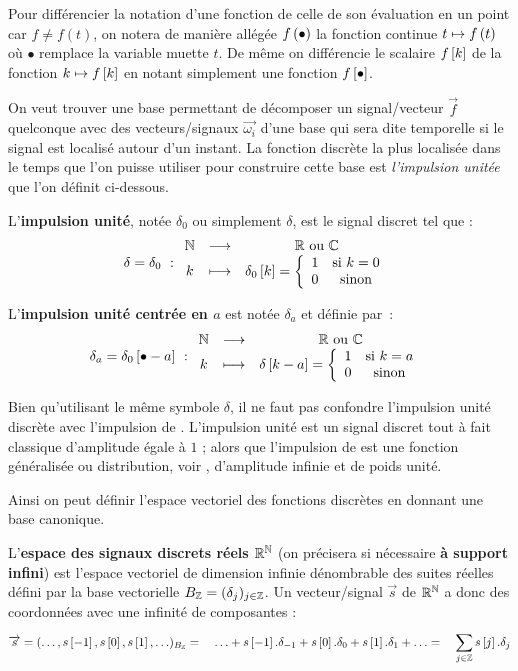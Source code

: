 Pour différencier la notation d'une fonction de celle de son
évaluation en un point car $f\neq f(t)$, on notera de manière allégée
$f\left(\bullet\right)$ la fonction continue $t\mapsto f\left(t\right)$ où $\bullet$
remplace la variable muette $t$. De même on différencie le scalaire
$f\left[k\right]$ de la fonction $k\mapsto f\left[k\right]$ en notant simplement une
fonction $f\left[\bullet\right]$.

On veut trouver une base permettant de décomposer un signal/vecteur
$\vec{f}$ quelconque avec des vecteurs/signaux $\vec{\omega_i}$ d'une
base qui sera dite temporelle si le signal est localisé autour d'un
instant. La fonction discrète la plus localisée dans le temps que l'on
puisse utiliser pour construire cette base est \emph{l'impulsion
  unitée} que l'on définit ci-dessous.
\begin{definition}
  \label{def:impulsion_unite}
  L'\textbf{impulsion unité}, notée $\delta_0$ ou simplement $\delta$,
  est le signal discret tel que :
  $$
  \delta=\delta_0~:\begin{array}{ccc} \mathbb{N} & \longrightarrow & \mathbb{R} \text{ ou } \mathbb{C} \\  k & \longmapsto & \delta_0\left[k\right]=\left\{\begin{array}{cc} {1} & {\text{si } k=0}\\ {0} & {\text{sinon}}\\ \end{array}\right. \\ \end{array} 
  $$

  L'\textbf{impulsion unité centrée en $a$} est notée $\delta_a$ et définie par~:
  $$
  \delta_a = \delta_0\left[\bullet-a\right]~: \begin{array}{ccc} \mathbb{N} & \longrightarrow & \mathbb{R} \text{ ou } \mathbb{C} \\ k & \longmapsto & \delta\left[k-a\right] =  \left\{\begin{array}{cc} {1} & {\text{si } k=a}\\ {0} & {\text{sinon}}\\ \end{array}\right. \\ \end{array}
  $$
\end{definition}

\begin{remarque}
  Bien qu'utilisant le même symbole $\delta$, il ne faut pas confondre
l'impulsion unité discrète avec l'impulsion de \Dirac. L'impulsion
unité est un signal discret tout à fait classique d'amplitude égale à
$1$ ; alors que l'impulsion de \Dirac{} est une fonction généralisée ou
distribution, voir , d'amplitude infinie et de
poids unité.
\end{remarque}

Ainsi on peut définir l'espace vectoriel des fonctions discrètes en
donnant une base canonique.

\begin{definition}
  \label{def:signal_discret}
  L'\textbf{espace des signaux discrets réels $\mathbb{R}^{\mathbb{N}}$} (on précisera si
  nécessaire \textbf{à support infini}) est l'espace vectoriel de
  dimension infinie dénombrable des suites réelles défini par la base
  vectorielle $B_{\mathbb{Z}}=(\delta_j)_{j\in\mathbb{Z}}$. Un vecteur/signal
  $\vec{s}$ de $\mathbb{R}^{\mathbb{N}}$ a donc des coordonnées avec une infinité de
  composantes :
  \begin{equation}
    \overrightarrow{s}  = (\ldots,s\left[-1\right], s\left[0\right], s\left[1\right], \ldots)_{B_{\mathbb{Z}}} = \quad \ldots + s\left[-1\right].\delta_{-1} + s\left[0\right].\delta_0 + s\left[1\right].\delta_1 + \ldots =\quad \sum\limits_{j\in\mathbb{Z}}^{}{s\left[j\right].\delta_j}
  \end{equation}
\end{definition}

